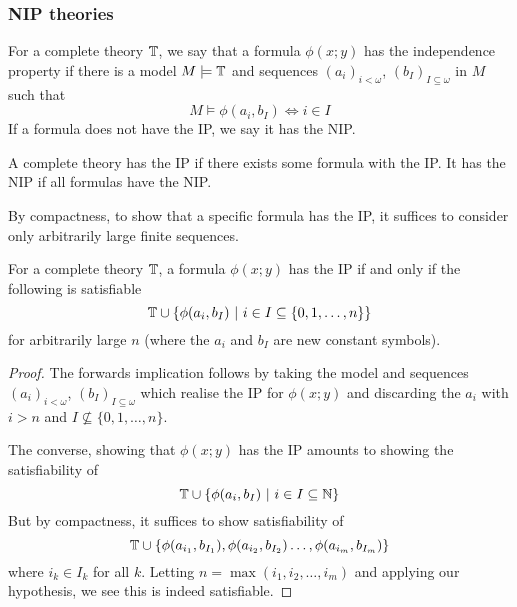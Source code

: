 \subsubsection{NIP theories}
\label{ssub:nip_theories}

\begin{defn}
  For a complete theory $\mathbb{T}$, we say that a formula $\phi(x;y)$ has the independence property
  if there is a model $M \models \mathbb{T}$ and sequences $(a_i)_{i<\omega}$,
  $(b_I)_{I \subseteq \omega}$ in $M$ such that
  \begin{equation*}
    M \models \phi(a_i,b_I) \iff i \in I
  \end{equation*}
  If a formula does not have the IP, we say it has the NIP.
\end{defn}

\begin{defn}
  A complete theory has the IP if there exists some formula with the IP. It has the NIP if all
  formulas have the NIP.
\end{defn}

By compactness, to show that a specific formula has the IP, it suffices to consider only arbitrarily
large finite sequences.

\begin{prop}
  For a complete theory $\mathbb{T}$, a formula $\phi(x;y)$ has the IP if and only if the following
  is satisfiable
  \begin{equation*}
    \mathbb{T} \cup \{\phi(a_i,b_I)\ |\ i \in I \subseteq \{0,1,\dots,n\}\}
  \end{equation*}
  for arbitrarily large $n$ (where the $a_i$ and $b_I$ are new constant symbols).
\end{prop}
\begin{proof}
  The forwards implication follows by taking the model and sequences $(a_i)_{i<\omega}$,
  $(b_I)_{I \subseteq \omega}$ which realise the IP for $\phi(x;y)$ and discarding the
  $a_i$ with $i > n$ and $I \nsubseteq \{0,1,\dots,n\}$.

  The converse, showing that $\phi(x;y)$ has the IP amounts to showing
  the satisfiability of
  \begin{equation*}
    \mathbb{T} \cup \{\phi(a_i,b_I)\ |\ i \in I \subseteq \mathbb{N} \}
  \end{equation*}
  But by compactness, it suffices to show satisfiability of
  \begin{equation*}
    \mathbb{T} \cup \{\phi(a_{i_1},b_{I_1}), \phi(a_{i_2},b_{I_2}) \dots, \phi(a_{i_m},b_{I_m})\}
  \end{equation*}
  where $i_k \in I_k$ for all $k$. Letting $n = \max(i_1,i_2,\dots,i_m)$ and applying our
  hypothesis, we see this is indeed satisfiable.
\end{proof}

